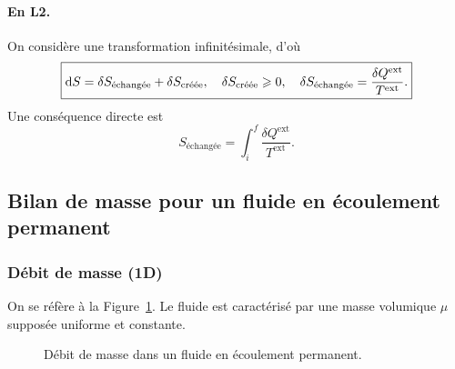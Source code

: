             \paragraph{En L2.}
                On considère une transformation infinitésimale, d'où
                \begin{equation}
                    \boxed{
                        \mathrm{d} S=\delta S_{\text{échangée}}+\delta S_{\text{créée}},\quad\delta S_{\text{créée}}\geqslant0,\quad\delta S_{\text{échangée}}=\frac{\delta Q^{\text{ext}}}{T^{\text{ext}}}.
                    }
                \end{equation}
                Une conséquence directe est 
                \begin{equation}
                    S_{\text{échangée}}=\int_{i}^{f}\frac{\delta Q^{\text{ext}}}{T^{\text{ext}}}.
                \end{equation}

    \subsection{Bilan de masse pour un fluide en écoulement permanent}
        \subsubsection{Débit de masse (1D)}

            On se réfère à la Figure~\ref{fig:debit_masse_fluide_ecoulement_permanent}. Le fluide est caractérisé par une masse volumique $\mu$ supposée uniforme et constante.

            \begin{figure}
                \centering
                \caption{Débit de masse dans un fluide en écoulement permanent.}    
                \label{fig:debit_masse_fluide_ecoulement_permanent}
            \end{figure}

